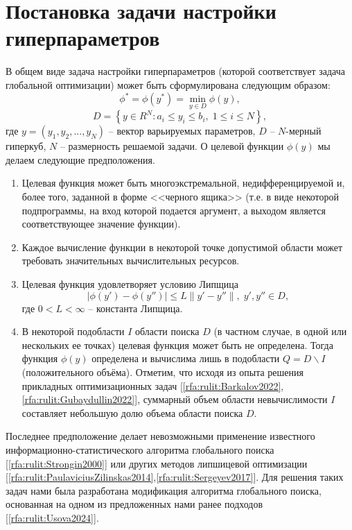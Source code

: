 \documentclass[a4paper,12pt,russian]{article}
\begin{document}
\section{Постановка задачи настройки гиперпараметров}
В общем виде задача настройки гиперпараметров (которой соответствует задача глобальной оптимизации) может быть сформулирована следующим образом:
\begin{equation}\label{eq1} 
\phi^*=\phi(y^* )=\min_{y \in D}{\phi(y)},
\end{equation}
\[
D=\left\{ y \in R^N: a_i \leq y_i \leq b_i, \; 1 \leq i \leq N\right\},
\]
где $y=(y_1,y_2,...,y_N)$ -- вектор варьируемых параметров, $D$ -- $N$-мерный гиперкуб, $N$ -- размерность решаемой задачи.
О целевой функции $\phi (y)$ мы делаем следующие предположения.

\begin{enumerate}
\item{Целевая функция может быть многоэкстремальной, недифференцируемой и, более того, заданной в форме <<черного ящика>> (т.е. в виде некоторой подпрограммы, на вход которой подается аргумент, а выходом является соответствующее значение функции).}
\item{Каждое вычисление функции в некоторой точке допустимой области может требовать значительных вычислительных ресурсов.}
\item{Целевая функция удовлетворяет условию Липщица
\begin{equation}\label{eq3} 
| \phi (y')-\phi (y'') | \leq L \| y'-y'' \|, \; y',y'' \in D,
\end{equation}
где $0<L<\infty$ -- константа Липщица.}
\item{В некоторой подобласти $I$ области поиска $D$ (в частном случае, в одной или нескольких ее точках) целевая функция может быть не определена. Тогда функция $\phi(y)$ определена и вычислима лишь в подобласти $Q = D \backslash I$ (положительного объёма). Отметим, что исходя из опыта решения прикладных оптимизационных задач [\ref{rfa:rulit:Barkalov2022},\ref{rfa:rulit:Gubaydullin2022}], суммарный объем области невычислимости $I$ составляет небольшую долю объема области поиска $D$.}
\end{enumerate}

Последнее предположение делает невозможными применение известного ин\-фор\-ма\-ци\-он\-но-ста\-тис\-ти\-чес\-ко\-го алгоритма глобального поиска [\ref{rfa:rulit:Strongin2000}] или других методов липшицевой оптимизации [\ref{rfa:rulit:PaulaviciusZilinskas2014},\ref{rfa:rulit:Sergeyev2017}]. Для решения таких задач нами была разработана модификация алгоритма глобального поиска, основанная на одном из предложенных нами ранее подходов [\ref{rfa:rulit:Usova2024}].
\end{document}
